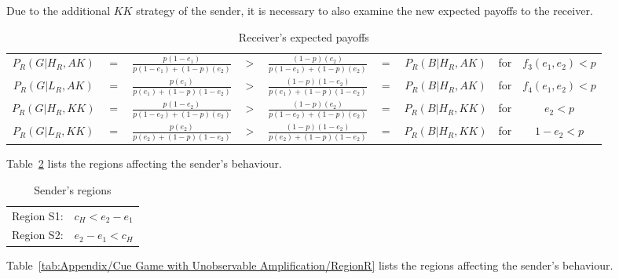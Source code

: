 \documentclass[a4paper,12pt]{article}
\numberwithin{equation}{section}
\begin{document}
Due to the additional $KK$ strategy of the sender, it is necessary to also examine the new expected payoffs to the receiver.
\begin{table}[h]
\setlength{\tabcolsep}{.2em}
\begin{center}
\begin{tabular}{ccccccccc}
$P_{R}(G|H_{R},AK)$ & $=$ & $\frac{p(1-e_{1})}{p(1-e_{1})+(1-p)(e_{2})}$ & $>$ & $\frac{(1-p)(e_{2})}{p(1-e_{1})+(1-p)(e_{2})}$ & $=$ & $P_{R}(B|H_{R},AK)$ & for & $f_{3}(e_{1},e_{2})<p$\\
$P_{R}(G|L_{R},AK)$ & $=$ & $\frac{p(e_{1})}{p(e_{1})+(1-p)(1-e_{2})}$ & $>$ & $\frac{(1-p)(1-e_{2})}{p(e_{1})+(1-p)(1-e_{2})}$ & $=$ & $P_{R}(B|H_{R},AK)$ & for & $f_{4}(e_{1},e_{2})<p$\\
$P_{R}(G|H_{R},KK)$ & $=$ & $\frac{p(1-e_{2})}{p(1-e_{2})+(1-p)(e_{2})}$ & $>$ & $\frac{(1-p)(e_{2})}{p(1-e_{2})+(1-p)(e_{2})}$ & $=$ & $P_{R}(B|H_{R},KK)$ & for & $e_{2}<p$\\
$P_{R}(G|L_{R},KK)$ & $=$ & $\frac{p(e_{2})}{p(e_{2})+(1-p)(1-e_{2})}$ & $>$ & $\frac{(1-p)(1-e_{2})}{p(e_{2})+(1-p)(1-e_{2})}$ & $=$ & $P_{R}(B|H_{R},KK)$ & for & $1-e_{2}<p$
\end{tabular}
\end{center}
\caption{Receiver's expected payoffs}
\label{eq:Appendix/Cue Game with Unobservable Amplification/ConditionalPayoffsR}
\end{table}

Table~\ref{tab:Appendix/Cue Game with Unobservable Amplification/RegionS} lists the regions affecting the sender's behaviour.
\begin{table}[!h]
\begin{center}
\begin{tabular}{lc}
Region S1: & $c_{H}<e_{2}-e_{1}$\\
Region S2: & $e_{2}-e_{1}<c_{H}$
\end{tabular}
\end{center}
\caption{Sender's regions}
\label{tab:Appendix/Cue Game with Unobservable Amplification/RegionS}
\end{table}

Table~\ref{tab:Appendix/Cue Game with Unobservable Amplification/RegionR} lists the regions affecting the sender's behaviour.

\newpage
\end{document}
